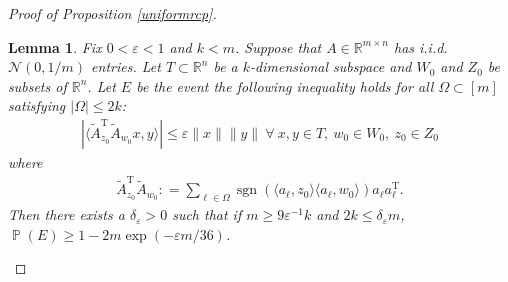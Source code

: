 \documentclass[11pt]{article}
\renewcommand{\epsilon}{\varepsilon}
\newcommand{\R}{\mathbb{R}}
\newcommand{\Pro}{\operatorname{\mathbb{P}}}
\newcommand{\sgn}{\operatorname{sgn}}
\renewcommand{\top}{{\mathrm{T}}}
\newtheorem{lem}{Lemma}
\theoremstyle{remark}
\begin{document}
\begin{proof}[Proof of Proposition \ref{uniformrcp}]
\begin{lem}\label{Atilde_small_lemma}
Fix $0 < \epsilon < 1$ and $k < m$. Suppose that $A \in \R^{m \times n}$ has i.i.d. $\mathcal{N}(0,1/m)$ entries. Let $T \subset \R^n$ be a $k$-dimensional subspace and $W_0$ and $Z_0$ be subsets of $\R^n$. Let $E$ be the event the following inequality holds for all $\Omega \subset [m]$ satisfying $|\Omega| \leqslant 2k$: \begin{align}
    |\langle\tilde{A}_{z_0}^\top \tilde{A}_{w_0} x,y \rangle | \leqslant \epsilon\|x\|\|y\|\ \forall\ x,y \in T,\ w_0 \in W_0,\ z_0 \in Z_0
    \label{Atilde_small_bound}
\end{align} where \begin{align*}
    \tilde{A}_{z_0}^\top \tilde{A}_{w_0} : = \sum_{\ell \in \Omega}\sgn(\langle a_{\ell},z_0\rangle \langle a_{\ell}, w_0\rangle) a_{\ell}a_{\ell}^\top.
\end{align*} Then there exists a $\delta_{\epsilon} > 0$ such that if $m \geqslant 9\epsilon^{-1}k$ and $2k \leqslant \delta_{\epsilon}m$, $\Pro(E) \geqslant 1 - 2m\exp(-\epsilon m/36)$.
\end{lem}


\end{proof}
\end{document}

